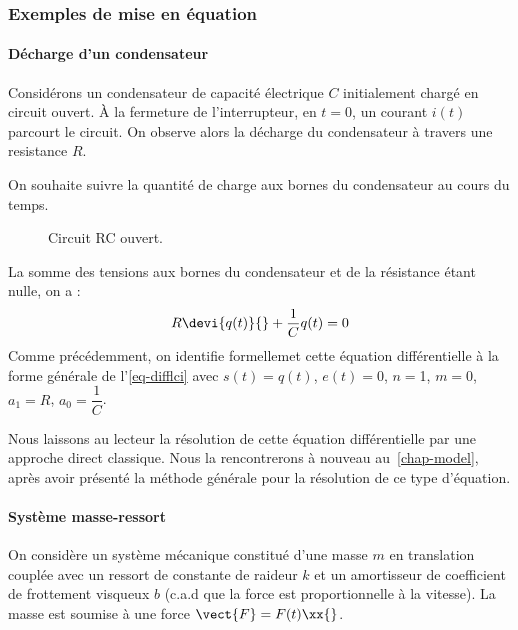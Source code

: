 \subsubsection{Exemples de mise en équation}

\paragraph{Décharge d'un condensateur}

Considérons un condensateur de capacité électrique $C$ 
initialement chargé en circuit ouvert.
À la fermeture de l'interrupteur, en $t=0$, 
un courant $i(t)$ parcourt le circuit.
On observe alors la décharge du condensateur à travers une resistance $R$. 

On souhaite suivre la quantité de charge aux bornes du condensateur au 
cours du temps.
\begin{figure}[!h]      
    \centering
    
    \caption{Circuit RC ouvert.\label{fig-decharge_condensateur}}
\end{figure}

La somme des tensions aux bornes du condensateur et de la résistance 
étant nulle, on a :
\begin{align*}
    R\devi{q(t)}{}+\dfrac{1}{C}q(t)=0 
\end{align*}
Comme précédemment, on identifie formellemet cette équation différentielle 
à la forme générale de l'\cref{eq-difflci} avec $s(t)=q(t)$, $e(t)=0$, 
$n=$1, $m=0$, $a_1=R$, $a_0=\dfrac{1}{C}$.

Nous laissons au lecteur la résolution de cette équation différentielle 
par une approche direct classique.
Nous la rencontrerons à nouveau au~\cref{chap-model}, après avoir 
présenté la méthode générale pour la résolution de ce type d'équation.

\paragraph{Système masse-ressort}
On considère un système mécanique constitué d'une masse $m$ en translation 
couplée avec un ressort de constante
de raideur $k$ et un amortisseur de coefficient de frottement 
visqueux $b$ (c.a.d que la force est 
proportionnelle à la vitesse). 
La masse est soumise à une force $\vect{F}=F(t)\xx{}$.

